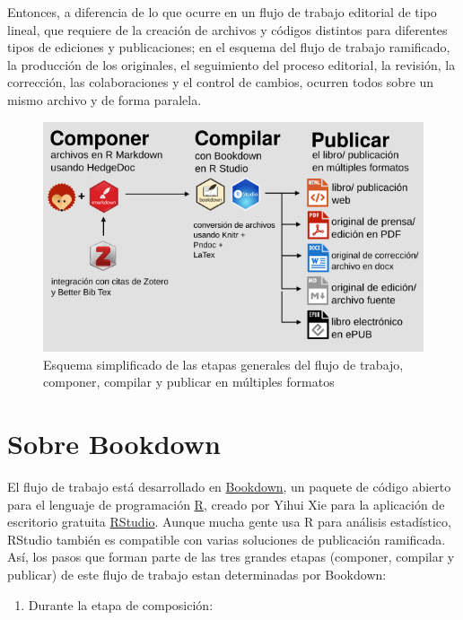 \documentclass[
]{book}
\providecommand{\tightlist}{%
  \setlength{\itemsep}{0pt}\setlength{\parskip}{0pt}}
\begin{document}
Entonces, a diferencia de lo que ocurre en un flujo de trabajo editorial de tipo lineal, que requiere de la creación de archivos y códigos distintos para diferentes tipos de ediciones y publicaciones; en el esquema del flujo de trabajo ramificado, la producción de los originales, el seguimiento del proceso editorial, la revisión, la corrección, las colaboraciones y el control de cambios, ocurren todos sobre un mismo archivo y de forma paralela.



\begin{figure}

{\centering \includegraphics[width=0.8\linewidth]{images/workflow} 

}

\caption{Esquema simplificado de las etapas generales del flujo de trabajo, componer, compilar y publicar en múltiples formatos}\label{fig:workflow}
\end{figure}

\hypertarget{sobre-bookdown}{%
\section{Sobre Bookdown}\label{sobre-bookdown}}

El flujo de trabajo está desarrollado en \href{https://bookdown.org}{Bookdown}, un paquete de código abierto para el lenguaje de programación \href{https://www.r-project.org/}{R}, creado por Yihui Xie para la aplicación de escritorio gratuita \href{https://rstudio.com/}{RStudio}. Aunque mucha gente usa R para análisis estadístico, RStudio también es compatible con varias soluciones de publicación ramificada. Así, los pasos que forman parte de las tres grandes etapas (componer, compilar y publicar) de este flujo de trabajo estan determinadas por Bookdown:

\begin{enumerate}
\def\labelenumi{\arabic{enumi}.}
\tightlist
\item
  Durante la etapa de composición:
\end{enumerate}
\end{document}
